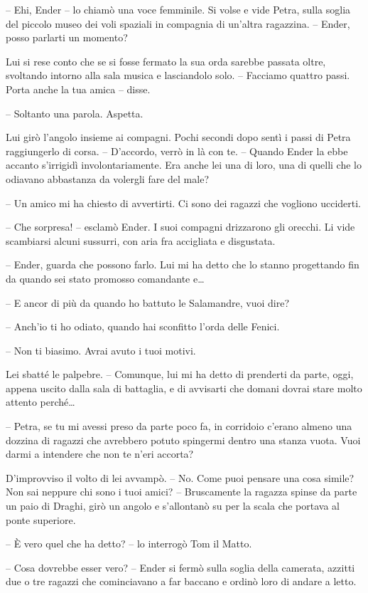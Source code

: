 {-- Ehi, Ender -- lo chiamò una voce femminile. Si volse e vide Petra,
	sulla soglia del piccolo museo dei voli spaziali in compagnia di
	un'altra ragazzina. -- Ender, posso parlarti un momento?}

{Lui si rese conto che se si fosse fermato la sua orda sarebbe passata
	oltre, svoltando intorno alla sala musica e lasciandolo solo. --
	Facciamo quattro passi. Porta anche la tua amica -- disse.}

{-- Soltanto una parola. Aspetta.}

{Lui girò l'angolo insieme ai compagni. Pochi secondi dopo sentì i passi
	di Petra raggiungerlo di corsa. -- D'accordo, verrò in là con te. --
	Quando Ender la ebbe accanto s'irrigidì involontariamente. Era anche lei
	una di loro, una di quelli che lo odiavano abbastanza da volergli fare
	del male?}

{-- Un amico mi ha chiesto di avvertirti. Ci sono dei ragazzi che
	vogliono ucciderti.}

{-- Che sorpresa! -- esclamò Ender. I suoi compagni drizzarono gli
	orecchi. Li vide scambiarsi alcuni sussurri, con aria fra accigliata e
	disgustata.}

{-- Ender, guarda che possono farlo. Lui mi ha detto che lo stanno
	progettando fin da quando sei stato promosso comandante e\ldots{}}

{-- E ancor di più da quando ho battuto le Salamandre, vuoi dire?}

{-- Anch'io ti ho odiato, quando hai sconfitto l'orda delle Fenici.}

{-- Non ti biasimo. Avrai avuto i tuoi motivi.}

{Lei sbatté le palpebre. -- Comunque, lui mi ha detto di prenderti da
	parte, oggi, appena uscito dalla sala di battaglia, e di avvisarti che
	domani dovrai stare molto attento perché\ldots{}}

{-- Petra, se tu mi avessi preso da parte poco fa, in corridoio c'erano
	almeno una dozzina di ragazzi che avrebbero potuto spingermi dentro una
	stanza vuota. Vuoi darmi a intendere che non te n'eri accorta?}

{D'improvviso il volto di lei avvampò. -- No. Come puoi pensare una cosa
	simile? Non sai neppure chi sono i tuoi amici? -- Bruscamente la ragazza
	spinse da parte un paio di Draghi, girò un angolo e s'allontanò su per
	la scala che portava al ponte superiore.}

{-- È vero quel che ha detto? -- lo interrogò Tom il Matto.}

{-- Cosa dovrebbe esser vero? -- Ender si fermò sulla soglia della
	camerata, azzitti due o tre ragazzi che cominciavano a far baccano e
	ordinò loro di andare a letto.}

